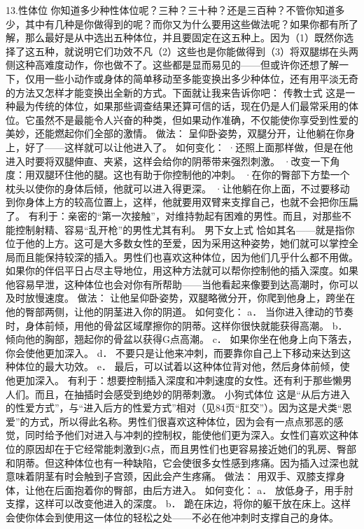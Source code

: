 \documentclass[12pt,UTF8]{ctexbook}
\begin{document}
13.性体位
你知道多少种性体位呢？三种？三十种？还是三百种？不管你知道多少，其中有几种是你做得到的呢？而你又为什么要用这些做法呢？如果你都有所了解，那么最好是从中选出五种体位，并且要固定在这五种上。因为（1）既然你选择了这五种，就说明它们功效不凡（2）这些也是你能做得到（3）将双腿绑在头两侧这种高难度动作，你也做不了。这些都是显而易见的——但或许你还想了解一下，仅用一些小动作或身体的简单移动至多能变换出多少种体位，还有用平淡无奇的方法又怎样才能变换出全新的方式。下面就让我来告诉你吧：
传教士式
这是一种最为传统的体位，如果那些调查结果还算可信的话，现在仍是人们最常采用的体位。它虽然不是最能令人兴奋的种类，但如果动作准确，不仅能使你享受到性爱的美妙，还能燃起你们全部的激情。
做法：
呈仰卧姿势，双腿分开，让他躺在你身上，好了——这样就可以让他进入了。
如何变化：
·还照上面那样做，但是在他进入时要将双腿伸直、夹紧，这样会给你的阴蒂带来强烈刺激。
·改变一下角度：用双腿环住他的腿。这也有助于你控制他的冲刺。
·在你的臀部下方垫一个枕头以使你的身体后倾，他就可以进入得更深。
·让他躺在你上面，不过要移动到你身体上方的较高位置上，这样，他就要用双臂来支撑自己，也就不会把你压扁了。
有利于：亲密的“第一次接触”，对维持勃起有困难的男性。而且，对那些不能控制射精、容易“乱开枪”的男性尤其有利。
男下女上式
恰如其名——就是指你位于他的上方。这可是大多数女性的至爱，因为采用这种姿势，她们就可以掌控全局而且能保持较深的插入。男性们也喜欢这种体位，因为他们几乎什么都不用做。如果你的伴侣平日占尽主导地位，用这种方法就可以帮你控制他的插入深度。如果他容易早泄，这种体位也会对你有所帮助——当他看起来像要到达高潮时，你可以及时放慢速度。
做法：
让他呈仰卧姿势，双腿略微分开，你爬到他身上，跨坐在他的臀部两侧，让他的阴茎进入你的阴道。
如何变化：
a． 当你进入律动的节奏时，身体前倾，用他的骨盆区域摩擦你的阴蒂。这样你很快就能获得高潮。
b． 倾向他的胸部，翘起你的骨盆以获得G点高潮。
c． 如果你坐在他身上向下落去，你会使他更加深入。
d． 不要只是让他来冲刺，而要靠你自己上下移动来达到这种体位的最大功效。
e． 最后，可以试着以这种体位背对他，然后身体前倾，使他更加深入。
有利于：想要控制插入深度和冲刺速度的女性。还有利于那些懒男人们。而且，在抽插时会感受到绝妙的阴蒂刺激。
小狗式体位
这是“从后方进入的性爱方式”，与“进入后方的性爱方式”相对（见84页“肛交”）。因为这是犬类“恩爱”的方式，所以得此名称。男性们很喜欢这种体位，因为会有一点点邪恶的感觉，同时给予他们对进入与冲刺的控制权，能使他们更为深入。女性们喜欢这种体位的原因却在于它经常能刺激到G点，而且男性们也更容易接近她们的乳房、臀部和阴蒂。但这种体位也有一种缺陷，它会使很多女性感到疼痛。因为插入过深也就意味着阴茎有时会触到子宫颈，因此会产生疼痛。
做法：
用双手、双膝支撑身体，让他在后面抱着你的臀部，由后方进入。
如何变化：
a． 放低身子，用手肘支撑，这样可以改变他进入的深度。
b． 跪在床边，将你的躯干放在床上。这样会使你体会到使用这一体位的轻松之处——不必在他冲刺时支撑自己的身体。
\end{document}
